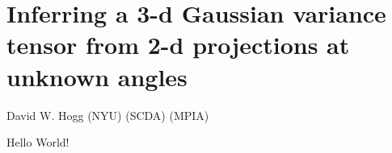 \documentclass[12pt]{article}
\begin{document}
\section*{Inferring a 3-d Gaussian variance tensor from 2-d projections at unknown angles}
\noindent
David W. Hogg (NYU) (SCDA) (MPIA)

\bigskip

Hello World!
\end{document}
